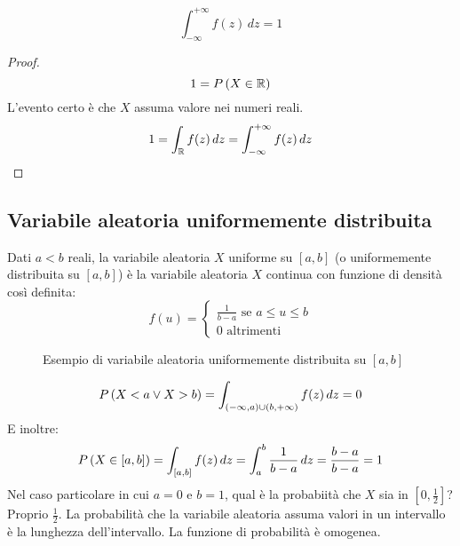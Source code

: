 \begin{oss}
\[
\int_{-\infty}^{+\infty} f(z) \, dz = 1
\]
\end{oss}

\begin{proof}
\[
1 = P \left( {X \in \mathbb{R}} \right)
\]
L'evento certo \`e che $X$ assuma valore nei numeri reali.
\[
1 = \int_{\mathbb{R}} f(z) \, dz = \int_{-\infty}^{+\infty} f(z) \, dz
\]
\end{proof}

\subsection{Variabile aleatoria uniformemente distribuita}

\begin{defn}
Dati $a < b$ reali, la variabile aleatoria $X$ uniforme su $[a,b]$ (o uniformemente distribuita su $[a,b]$) \`e la variabile aleatoria $X$ continua con funzione di densit\`a cos\`i definita:
\[
f(u) =
\begin{cases}
\frac{1}{b - a} \text{ se } a \le u \le b \\
0 \text{ altrimenti}
\end{cases}
\]
\end{defn}

\begin{figure}[ht]
\centering
{}
\caption{\label{fig:distribuzione}Esempio di variabile aleatoria uniformemente distribuita su $[a,b]$}
\end{figure}
\[
P \left( {X < a \lor X > b} \right) =
\int_{(-\infty,a) \cup (b,+\infty)} f(z) \, dz = 0
\]
E inoltre:
\[
P \left( {X \in [a,b]} \right) =
\int_{[a,b]} f(z) \, dz = \int_{a}^{b} \frac{1}{b - a} \, dz = 
\frac{b - a}{b - a} = 1
\]
Nel caso particolare in cui $a = 0$ e $b = 1$, qual \`e la probabiit\`a che $X$ sia in $[0, \frac{1}{2}]$? Proprio $\frac{1}{2}$. La probabilit\`a che la variabile aleatoria assuma valori in un intervallo \`e la lunghezza dell'intervallo. La funzione di probabilit\`a \`e omogenea.

